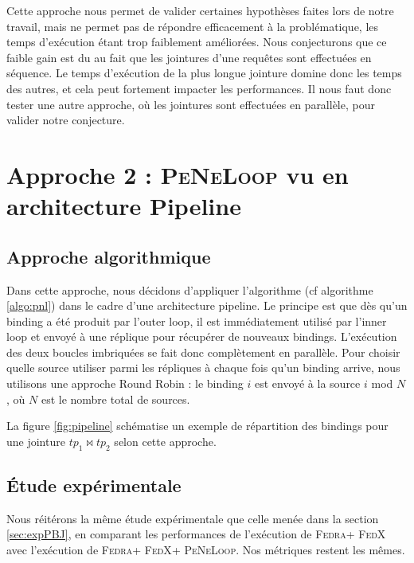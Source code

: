 \documentclass[a4paper]{article}
\def\fedra{\textsc{Fedra}\xspace}
\def\fedx{\textsc{FedX}\xspace}
\def\peneloop{\textsc{PeNeLoop}\xspace}
\begin{document}
Cette approche nous permet de valider certaines hypothèses faites lors de notre travail, mais ne permet pas de répondre efficacement à la problématique, les temps d'exécution étant trop faiblement améliorées. Nous conjecturons que ce faible gain est du au fait que les jointures d'une requêtes sont effectuées en séquence. Le temps d'exécution de la plus longue jointure domine donc les temps des autres, et cela peut fortement impacter les performances. Il nous faut donc tester une autre approche, où les jointures sont effectuées en parallèle, pour valider notre conjecture.

\section{Approche 2 : \peneloop vu en architecture Pipeline}

\subsection{Approche algorithmique}

Dans cette approche, nous décidons d'appliquer l'algorithme (cf algorithme \ref{algo:pnl}) dans le cadre d'une architecture pipeline. Le principe est que dès qu'un binding a été produit par l'outer loop, il est immédiatement utilisé par l'inner loop et envoyé à une réplique pour récupérer de nouveaux bindings. L'exécution des deux boucles imbriquées se fait donc complètement en parallèle. Pour choisir quelle source utiliser parmi les répliques à chaque fois qu'un binding arrive, nous utilisons une approche Round Robin : le binding $i$ est envoyé à la source $i$ mod $N$, où $N$ est le nombre total de sources.

La figure \ref{fig:pipeline} schématise un exemple de répartition des bindings pour une jointure $tp_1 \bowtie tp_2$ selon cette approche.





\subsection{Étude expérimentale}

Nous réitérons la même étude expérimentale que celle menée dans la section \ref{sec:expPBJ}, en comparant les performances de l'exécution de \fedra + \fedx avec l'exécution de \fedra + \fedx + \peneloop. Nos métriques restent les mêmes.
\end{document}
